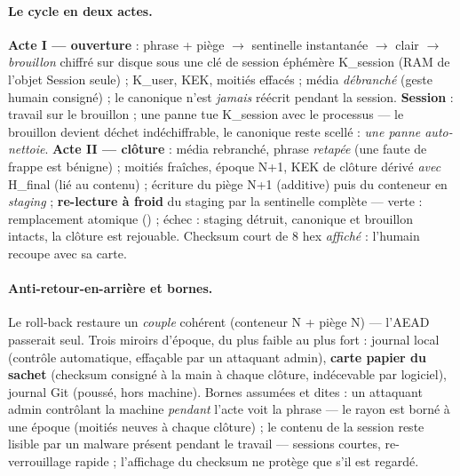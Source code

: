 \paragraph{Le cycle en deux actes.} \textbf{Acte I — ouverture} : phrase + piège $\to$
sentinelle instantanée $\to$ clair $\to$ \emph{brouillon} chiffré sur disque sous une
clé de session éphémère K\_session (RAM de l'objet Session seule) ; K\_user, KEK,
moitiés effacés ; média \emph{débranché} (geste humain consigné) ; le canonique n'est
\emph{jamais} réécrit pendant la session. \textbf{Session} : travail sur le brouillon ;
une panne tue K\_session avec le processus — le brouillon devient déchet indéchiffrable,
le canonique reste scellé : \emph{une panne auto-nettoie}. \textbf{Acte II — clôture} :
média rebranché, phrase \emph{retapée} (une faute de frappe est bénigne) ; moitiés
fraîches, époque N+1, KEK de clôture dérivé \emph{avec} H\_final (lié au contenu) ;
écriture du piège N+1 (additive) puis du conteneur en \emph{staging} ; \textbf{re-lecture
à froid} du staging par la sentinelle complète — verte : remplacement atomique
() ; échec : staging détruit, canonique et brouillon intacts, la
clôture est rejouable. Checksum court de 8 hex \emph{affiché} : l'humain recoupe avec
sa carte.

\paragraph{Anti-retour-en-arrière et bornes.} Le roll-back restaure un \emph{couple}
cohérent (conteneur N + piège N) — l'AEAD passerait seul. Trois miroirs d'époque, du
plus faible au plus fort : journal local (contrôle automatique, effaçable par un
attaquant admin), \textbf{carte papier du sachet} (checksum consigné à la main à chaque
clôture, indécevable par logiciel), journal Git (poussé, hors machine). Bornes assumées
et dites : un attaquant admin contrôlant la machine \emph{pendant} l'acte voit la phrase
— le rayon est borné à une époque (moitiés neuves à chaque clôture) ; le contenu de la
session reste lisible par un malware présent pendant le travail — sessions courtes,
re-verrouillage rapide ; l'affichage du checksum ne protège que s'il est regardé.

